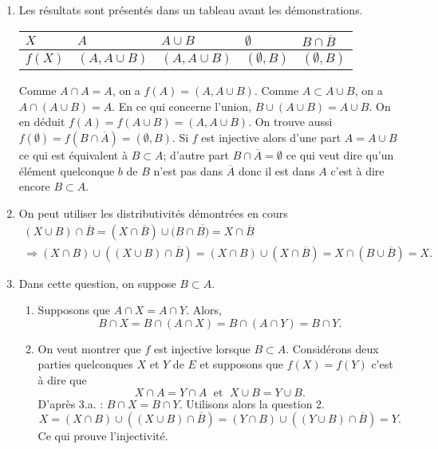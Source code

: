 \begin{enumerate}
  \item Les résultats sont présentés dans un tableau avant les démonstrations.
\begin{center}
\renewcommand{\arraystretch}{1.2}
\begin{tabular}{|l|l|l|l|l|} \hline 
$X$    & $A$             & $A\cup B$       & $\emptyset$       & $B \cap \overline{B}$ \\ \hline
$f(X)$ & $(A, A \cup B)$ & $(A, A \cup B)$ & $(\emptyset , B)$ & $(\emptyset , B)$     \\ \hline
\end{tabular}
\end{center}
  
  Comme $A\cap A = A$, on a $f(A) = (A,A\cup B)$. Comme $A\subset A \cup B$, on a $A\cap(A\cup B) = A$. En ce qui concerne l'union, $B\cup(A\cup B)=A\cup B$.\newline
  On en déduit $f(A) = f(A\cup B) = (A, A\cup B)$. On trouve aussi  $f(\emptyset) = f(B\cap \overline{A}) = (\emptyset, B)$.\newline
Si $f$ est injective alors d'une part $A = A\cup B$ ce qui est équivalent à $B \subset A$; d'autre part $B\cap \overline{A}=\emptyset$ ce qui veut dire qu'un élément quelconque $b$ de $B$ n'est pas dans $\overline{A}$ donc il est dans $A$ c'est à dire encore $B \subset A$.
  \item On peut utiliser les distributivités démontrées en cours
\begin{multline*}
(X \cup B) \cap \overline{B} = (X \cap \overline{B}) \cup (B\cap \overline{B)} =  X \cap \overline{B} \\
\Rightarrow
(X \cap B) \cup \left( (X\cup B) \cap \overline{B}\right) 
= (X \cap B) \cup (X \cap \overline{B})
= X \cap (B \cup \overline{B}) = X.
\end{multline*}

  \item Dans cette question, on suppose $B \subset A$.
\begin{enumerate}
  \item Supposons que $A\cap X = A\cap Y$. Alors,
\begin{displaymath}
B \cap X = B \cap (A \cap X) = B \cap (A \cap Y) = B \cap Y.
\end{displaymath}

  \item On veut montrer que $f$ est injective lorsque $B \subset A$. Considérons deux parties quelconques $X$ et $Y$ de $E$ et supposons que $f(X)=f(Y)$ c'est à dire que 
\begin{displaymath}
X\cap A = Y \cap A \; \text{ et } \;  X \cup B = Y \cup B  .
\end{displaymath}
D'après 3.a. : $B\cap X = B \cap Y$. Utilisons alors la question 2. 
\begin{displaymath}
 X = (X \cap B) \cup \left( (X\cup B) \cap \overline{B}\right) 
 = (Y \cap B) \cup \left( (Y\cup B) \cap \overline{B}\right)
 = Y .
\end{displaymath}
Ce qui prouve l'injectivité.

\end{enumerate}
\end{enumerate}
